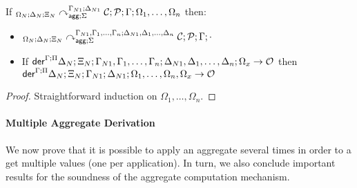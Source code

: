 \begin{theorem}\label{thm:aggregate_derivation}
If ${{}_{\Omega_N ; \Delta_N ; \Xi_N}\curvearrowright}_{\mathsf{agg} ; \Sigma}^{\Gamma_{N1}; \Delta_{N1}} \; \mathcal{C}; \mathcal{P} ; \Gamma ; \Omega_1,
\dotsc, \Omega_n$ then:

\begin{itemize}[leftmargin=*]
   \item ${{}_{\Omega_N ; \Delta_N ; \Xi_N}\curvearrowright}_{\mathsf{agg} ; \Sigma}^{\Gamma_{N1}, \Gamma_1, \dotsc,
      \Gamma_n; \Delta_{N1}, \Delta_1, \dotsc, \Delta_n} \; \mathcal{C};
         \mathcal{P} ; \Gamma ; \cdot$

   \item If $\mathsf{der}^{\Gamma ; \Pi} \Delta_N ; \Xi_N; \Gamma_{N1}, \Gamma_1, \dotsc,
         \Gamma_n; \Delta_{N1}, \Delta_1, \dotsc, \Delta_n; \Omega_x \rightarrow \mathcal{O}$ then\\
         \hspace{2cm}
   $\mathsf{der}^{\Gamma ; \Pi} \Delta_N ; \Xi_N; \Gamma_{N1}; \Delta_{N1}; \Omega_1, \dotsc,
   \Omega_n, \Omega_x \rightarrow \mathcal{O}$

\end{itemize}
\end{theorem}

\begin{proof}
Straightforward induction on $\Omega_1, \dotsc, \Omega_n$.
\end{proof}


\paragraph{Multiple Aggregate Derivation} We now prove that it is possible
to apply an aggregate several times in order to a get multiple values (one per
application). In turn, we also conclude important results for the
soundness of the aggregate computation mechanism.

